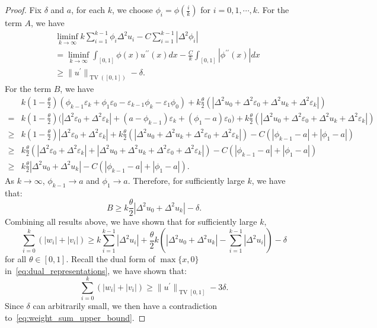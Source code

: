 \documentclass[10pt,a4paper]{amsart}
\begin{document}
\begin{proof}
Fix $\delta$ and $a$, for each $k$, we choose $\phi_i = \phi(\frac i k)$ for $i=0,1,\cdots, k$. For the term $A$, we have
\begin{equation}
    \label{eq:main_term_estimate}
\begin{aligned}
    &\liminf_{k\to \infty}  k\sum_{i=1}^{k-1} \phi_i\Delta^2 u_i- C\sum_{i=1}^{k-1} |\Delta^2\phi_i| \\
    &=\liminf_{k\to \infty} \int_{[0,1]} \phi(x) u^{\prime\prime}(x)dx - \frac{C}{k}\int_{[0,1]} |\phi^{\prime\prime}(x)|dx\\
    & \ge \|u^\prime\|_{\operatorname{TV}([0,1])} -\delta.
\end{aligned}
\end{equation}
For the term $B$, we have
\begin{equation}
    \label{eq:remaining_term}
    \begin{aligned}
            &k(1-\frac \theta 2)(\phi_{k-1} \varepsilon_k+\phi_1 \varepsilon_0-\varepsilon_{k-1}\phi_k-\varepsilon_1\phi_0)+k\frac{\theta}{2}(|\Delta^2 u_0+\Delta^2 \varepsilon_0 + \Delta^2 u_k+\Delta^2 \varepsilon_k|)\\
            = & k(1-\frac \theta 2)\bigl(|\Delta^2 \varepsilon_0+\Delta^2\varepsilon_k|+ (a-\phi_{k-1})\varepsilon_k+(\phi_1-a)\varepsilon_0 \bigr)+k\frac{\theta}{2}(|\Delta^2 u_0+\Delta^2 \varepsilon_0 + \Delta^2 u_k+\Delta^2 \varepsilon_k|)\\
            \ge  & k(1-\frac \theta 2)|\Delta^2 \varepsilon_0+\Delta^2\varepsilon_k|+k\frac{\theta}{2}(|\Delta^2 u_0+ \Delta^2 u_k+\Delta^2 \varepsilon_0 +\Delta^2 \varepsilon_k|) - C(|\phi_{k-1}-a|+|\phi_1-a|)\\
            \ge & k\frac{\theta}{2}(|\Delta^2 \varepsilon_0+\Delta^2\varepsilon_k|+|\Delta^2 u_0+ \Delta^2 u_k+\Delta^2 \varepsilon_0 +\Delta^2 \varepsilon_k|)- C(|\phi_{k-1}-a|+|\phi_1-a|)\\
            \ge & k\frac \theta 2 |\Delta^2 u_0+\Delta^2 u_k|-C(|\phi_{k-1}-a|+|\phi_1-a|).
    \end{aligned}
\end{equation}
As $k\to \infty$, $\phi_{k-1}\to a$ and $\phi_1\to a$. Therefore, for sufficiently large $k$, we have that:
\begin{equation}
B \ge k\frac \theta 2 |\Delta^2 u_0+\Delta^2 u_k|-\delta.
\end{equation}
Combining all results above, we have shown that for sufficiently large $k$,
\begin{equation}
    \sum_{i=0}^k \left(|w_i|+|v_i|\right)\ge k\sum_{i=1}^{k-1} |\Delta^2 u_i|+ \frac \theta 2 k\left( |\Delta^2 u_0 + \Delta^2 u_k|-\sum_{i=1}^{k-1} |\Delta^2 u_i|\right)-\delta
\end{equation}
for all $\theta\in [0,1]$. Recall the dual form of $\max\{x, 0\}$ in~\eqref{eq:dual_representations},
we have shown that:
\begin{equation}
    \sum_{i=0}^k \left(|w_i|+|v_i|\right)\ge \|{u^\prime}\|_{\operatorname{TV}[0,1]} -3\delta.
\end{equation}
Since $\delta$ can arbitrarily small,  we then have a contradiction to~\eqref{eq:weight_sum_upper_bound}.
\end{proof}
\end{document}
